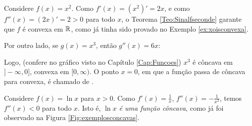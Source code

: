 \begin{ex}
Considere $f(x)=x^2$. Como $f'(x)=(x^2)'=2x$, e como $f''(x)=(2x)'=2>0$ para
todo $x$, o Teorema \ref{Teo:Sinalfseconde} garante que $f$ é convexa em $\mathbb{R}$,
como já tinha sido provado no Exemplo \ref{ex:xoisconvexa}.

Por outro lado, se $g(x)=x^3$, então $g''(x)=6x$:
\begin{center}
\begin{bmlimage}\end{bmlimage}
\end{center}
Logo, (confere no gráfico visto
no Capítulo \ref{Cap:Funcoes}) $x^3$ é côncava em $]-\infty,0]$, 
convexa em $[0,\infty)$. O ponto $x=0$, em que a função passa de côncava para
convexa, é chamado de .
\end{ex}

\begin{ex}
Considere $f(x)=\ln x$ para $x>0$. Como $f'(x)=\frac{1}{x}$,
$f''(x)=-\frac{1}{x^2}$, temos $f''(x)<0$ para todo $x$. Isto é, \emph{$\ln x$
é uma função côncava}, como já foi observado na Figura
\eqref{Fig:exemplosconcavas}.
\end{ex}

